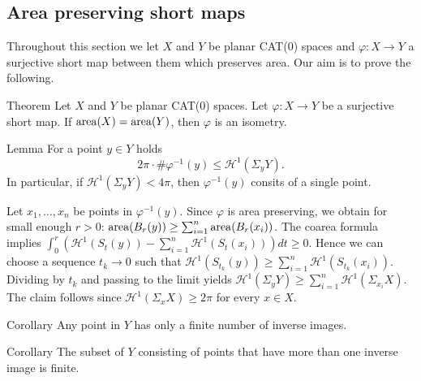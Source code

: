 \documentclass[a4paper,10pt]{amsart}
\begin{document}
\subsection{Area preserving short maps}


Throughout this section we let $X$ and $Y$ be planar CAT(0) spaces and
 $\varphi:X\to Y$ a surjective short map between them which preserves area.
 Our aim is to prove the following.

\begin{thm}{Theorem}\label{thm:short+area=isom}
Let $X$ and $Y$ be planar CAT(0) spaces. 
Let $\varphi:X\to Y$ be a surjective short map. If $\mathop{\rm area}\nolimits(X)=\mathop{\rm area}\nolimits(Y)$,
then $\varphi$ is an isometry. 
\end{thm}


\begin{thm}{Lemma}\label{lem:inverse image estimate}
For a point $y\in Y$ holds 
$$
2\pi\cdot \#\varphi^{-1}(y)\leq\mathcal{H}^1(\Sigma_y Y). 
$$
In particular, if $\mathcal{H}^1(\Sigma_y Y)<4\pi$, then $\varphi^{-1}(y)$
consits of a single point.
\end{thm}

Let $x_1,\ldots,x_n$ be points in $\varphi^{-1}(y)$. Since $\varphi$
is area preserving, we obtain for small enough $r>0$:
$\mathop{\rm area}\nolimits(B_r(y))\geq\sum_{i=1}^n\mathop{\rm area}\nolimits(B_r(x_i))$. The coarea formula implies
$\int_0^r(\mathcal{H}^1(S_t(y))-\sum_{i=1}^n \mathcal{H}^1(S_t(x_i)))dt\geq 0$.
Hence we can choose a sequence $t_k\to 0$ such that 
$\mathcal{H}^1(S_{t_k}(y))\geq\sum_{i=1}^n \mathcal{H}^1(S_{t_k}(x_i))$. 
Dividing by $t_k$ and passing to the limit yields 
$\mathcal{H}^1(\Sigma_y Y)\geq\sum_{i=1}^n\mathcal{H}^1(\Sigma_{x_i}X)$.
The claim follows since $\mathcal{H}^1(\Sigma_{x}X)\geq 2\pi$
for every $x\in X$.
\qeds


\begin{thm}{Corollary}\label{cor:finite point inverses}
Any point in $Y$ has only a finite number of inverse images.
\end{thm}


\begin{thm}{Corollary}\label{cor:finite point inverses}
The subset of $Y$ consisting of points that have more than
one inverse image is finite.
\end{thm}
\end{document}
